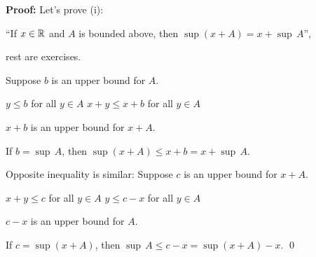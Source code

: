 \documentclass[10pt,aspectratio=149]{beamer}
\begin{document}
\begin{frame}

\textbf{Proof:}
Let's prove (i):

``If $x \in {\mathbb{R}}$ and $A$ is bounded above, then $\sup (x+A) = x
+ \sup\, A$'',

rest are exercises.

\medskip
\pause

Suppose $b$ is an upper bound for $A$.

\medskip
\pause

\thus \quad
$y \leq b$ for all $y \in A$
\wthus
$x+y \leq x+b$ for all $y \in A$

\medskip
\pause

\thus \quad $x+b$ is an upper bound for $x+A$.

\medskip
\pause

If $b = \sup\, A$, then
\quad
$\sup (x+A) \leq x+b = x+ \sup\, A$.

\medskip
\pause

Opposite inequality is similar:
\quad
\pause
Suppose $c$ is an upper bound for $x+A$.

\medskip
\pause

\thus \quad $x+y \leq c$ for all $y \in A$
\pause
\wthus
$y \leq c-x$ for all $y \in A$

\medskip
\pause

\thus \quad
$c-x$ is an upper bound for $A$.

\medskip
\pause

If $c = \sup (x+A)$, then \quad
$\sup\, A \leq c-x = \sup (x+A) -x$.
\qed

\end{frame}
\end{document}
